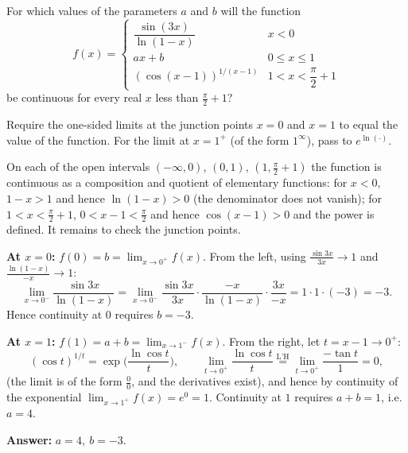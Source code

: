 
\begin{question}
For which values of the parameters $a$ and $b$ will the function
\[ f(x)=\begin{cases} \dfrac{\sin(3x)}{\ln(1-x)} & x<0\\[2mm] ax+b & 0\le x\le1\\[2mm] (\cos(x-1))^{1/(x-1)} & 1<x<\dfrac{\pi}{2}+1\end{cases} \]
be continuous for every real $x$ less than $\frac{\pi}{2}+1$?
\end{question}

\begin{hint}
Require the one-sided limits at the junction points $x=0$ and $x=1$ to equal the value of the function. For the limit at $x=1^+$ (of the form $1^\infty$), pass to $e^{\ln(\cdot)}$.
\end{hint}

\begin{solution}
On each of the open intervals $(-\infty,0)$, $(0,1)$, $(1,\frac\pi2+1)$ the function is continuous as a composition and quotient of elementary functions: for $x<0$, $1-x>1$ and hence $\ln(1-x)>0$ (the denominator does not vanish); for $1<x<\frac\pi2+1$, $0<x-1<\frac\pi2$ and hence $\cos(x-1)>0$ and the power is defined. It remains to check the junction points.

\textbf{At $x=0$:} $f(0)=b=\lim_{x\to0^+}f(x)$. From the left, using $\frac{\sin 3x}{3x}\to1$ and $\frac{\ln(1-x)}{-x}\to1$:
\[ \lim_{x\to0^-}\frac{\sin3x}{\ln(1-x)}=\lim_{x\to0^-}\frac{\sin3x}{3x}\cdot\frac{-x}{\ln(1-x)}\cdot\frac{3x}{-x}=1\cdot1\cdot(-3)=-3 . \]
Hence continuity at $0$ requires $b=-3$.

\textbf{At $x=1$:} $f(1)=a+b=\lim_{x\to1^-}f(x)$. From the right, let $t=x-1\to0^+$:
\[ (\cos t)^{1/t}=\exp\Big(\frac{\ln\cos t}{t}\Big),\qquad \lim_{t\to0^+}\frac{\ln\cos t}{t}\overset{\text{L'H}}{=}\lim_{t\to0^+}\frac{-\tan t}{1}=0 , \]
(the limit is of the form $\frac00$, and the derivatives exist), and hence by continuity of the exponential $\lim_{x\to1^+}f(x)=e^0=1$. Continuity at $1$ requires $a+b=1$, i.e. $a=4$.

\textbf{Answer:} $\boxed{a=4,\ b=-3}$.
\end{solution}
